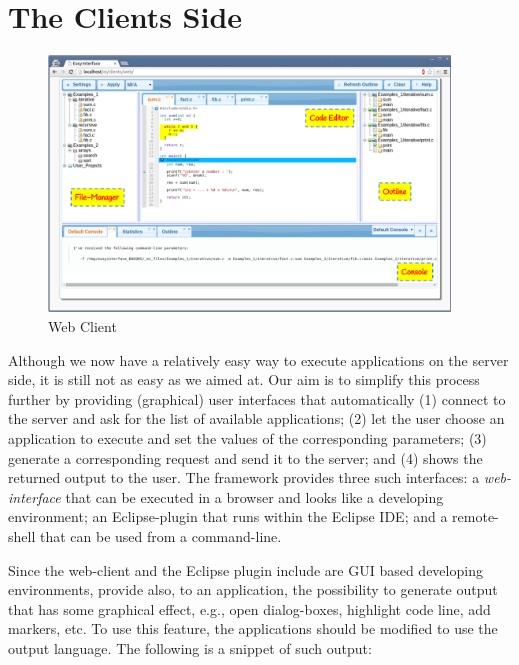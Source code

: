 \section{The Clients Side}
\label{ch:overview:arch:clients}

\begin{figure}[t]
\begin{center}
\includegraphics[width=0.95\textwidth]{fig/webclient.pdf}
\end{center}
\caption{\ei Web Client}
\label{fig:webclient}
\end{figure}

Although we now have a relatively easy way to execute applications on
the server side, it is still not as easy as we aimed at.
%
Our aim is to simplify this process further by providing (graphical)
user interfaces that automatically (1) connect to the \ei server and
ask for the list of available applications; (2) let the user choose an
application to execute and set the values of the corresponding
parameters; (3) generate a corresponding request and send it to the
\ei server; and (4) shows the returned output to the user.
%
The \ei framework provides three such interfaces: a
\emph{web-interface} that can be executed in a browser and looks like
a developing environment; an Eclipse-plugin that runs within the
Eclipse IDE; and a remote-shell that can be used from a command-line.

Since the web-client and the Eclipse plugin include are GUI based
developing environments, \ei provide also, to an application, the
possibility to generate output that has some graphical effect, e.g.,
open dialog-boxes, highlight code line, add markers, etc. To use this
feature, the applications should be modified to use the \ei output
language. The following is a snippet of such output:

